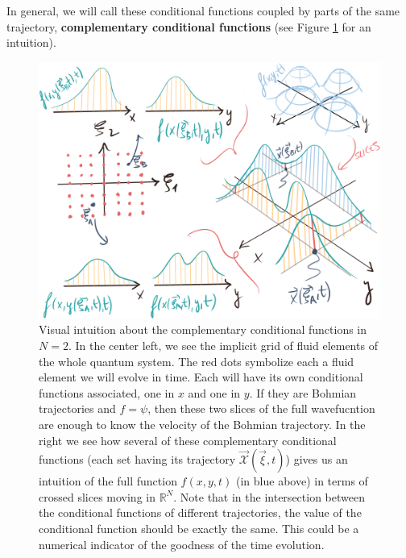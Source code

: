 \documentclass[11pt, a4paper]{article} %
\newcommand{\R}{\mathbb{R}} %
\newcommand{\x}{\mathcal{X}}
\begin{document}
In general, we will call these conditional functions coupled by parts of the same trajectory, {\bf complementary conditional functions} (see Figure \ref{fig:complementary} for an intuition).
\vspace{0.3cm}

\begin{figure}[h!]
  \centering
    \includegraphics[width=0.75\linewidth]{7slices_complementary.png}
  \caption{ Visual intuition about the complementary conditional functions in $N=2$. In the center left, we see the implicit grid of fluid elements of the whole quantum system. The red dots symbolize each a fluid element we will evolve in time. Each will have its own conditional functions associated, one in $x$ and one in $y$. If they are Bohmian trajectories and $f=\psi$, then these two slices of the full wavefucntion are enough to know the velocity of the Bohmian trajectory. In the right we see how several of these complementary conditional functions (each set having its trajectory $\vec{\x}(\vec{\xi},t)$) gives us an intuition of the full function $f(x,y,t)$ (in blue above) in terms of crossed slices moving in $\R^N$. Note that in the intersection between the conditional functions of different trajectories, the value of the conditional function should be exactly the same. This could be a numerical indicator of the goodness of the time evolution. }
  \label{fig:complementary}
\end{figure}
\end{document}
